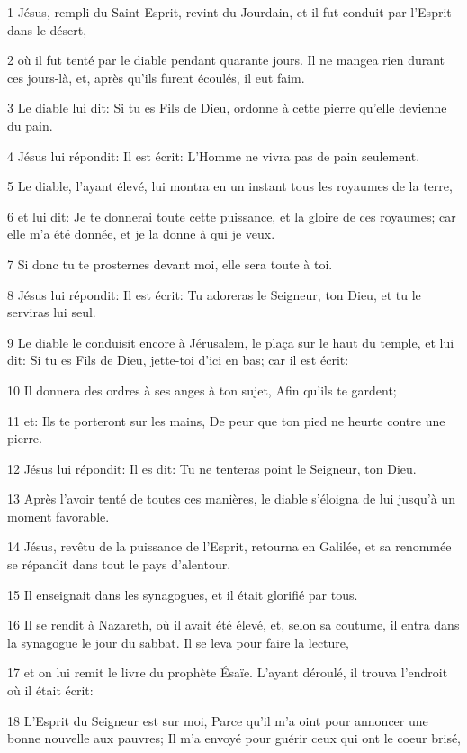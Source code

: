 \par 1 Jésus, rempli du Saint Esprit, revint du Jourdain, et il fut conduit par l'Esprit dans le désert,
\par 2 où il fut tenté par le diable pendant quarante jours. Il ne mangea rien durant ces jours-là, et, après qu'ils furent écoulés, il eut faim.
\par 3 Le diable lui dit: Si tu es Fils de Dieu, ordonne à cette pierre qu'elle devienne du pain.
\par 4 Jésus lui répondit: Il est écrit: L'Homme ne vivra pas de pain seulement.
\par 5 Le diable, l'ayant élevé, lui montra en un instant tous les royaumes de la terre,
\par 6 et lui dit: Je te donnerai toute cette puissance, et la gloire de ces royaumes; car elle m'a été donnée, et je la donne à qui je veux.
\par 7 Si donc tu te prosternes devant moi, elle sera toute à toi.
\par 8 Jésus lui répondit: Il est écrit: Tu adoreras le Seigneur, ton Dieu, et tu le serviras lui seul.
\par 9 Le diable le conduisit encore à Jérusalem, le plaça sur le haut du temple, et lui dit: Si tu es Fils de Dieu, jette-toi d'ici en bas; car il est écrit:
\par 10 Il donnera des ordres à ses anges à ton sujet, Afin qu'ils te gardent;
\par 11 et: Ils te porteront sur les mains, De peur que ton pied ne heurte contre une pierre.
\par 12 Jésus lui répondit: Il es dit: Tu ne tenteras point le Seigneur, ton Dieu.
\par 13 Après l'avoir tenté de toutes ces manières, le diable s'éloigna de lui jusqu'à un moment favorable.
\par 14 Jésus, revêtu de la puissance de l'Esprit, retourna en Galilée, et sa renommée se répandit dans tout le pays d'alentour.
\par 15 Il enseignait dans les synagogues, et il était glorifié par tous.
\par 16 Il se rendit à Nazareth, où il avait été élevé, et, selon sa coutume, il entra dans la synagogue le jour du sabbat. Il se leva pour faire la lecture,
\par 17 et on lui remit le livre du prophète Ésaïe. L'ayant déroulé, il trouva l'endroit où il était écrit:
\par 18 L'Esprit du Seigneur est sur moi, Parce qu'il m'a oint pour annoncer une bonne nouvelle aux pauvres; Il m'a envoyé pour guérir ceux qui ont le coeur brisé,
